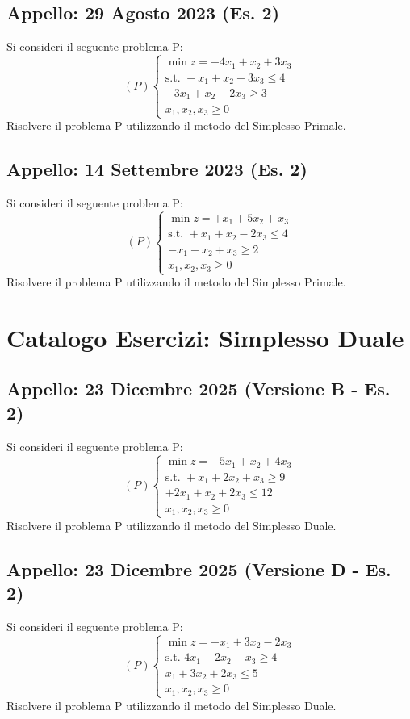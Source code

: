 \documentclass[11pt, a4paper]{article}
\begin{document}
\subsection{Appello: 29 Agosto 2023 (Es. 2)}
Si consideri il seguente problema P:
\[ (P) \begin{cases} \min z = -4x_1 + x_2 + 3x_3 \\ \text{s.t. } -x_1 + x_2 + 3x_3 \le 4 \\ -3x_1 + x_2 - 2x_3 \ge 3 \\ x_1, x_2, x_3 \ge 0 \end{cases} \]
Risolvere il problema P utilizzando il metodo del Simplesso Primale.

\subsection{Appello: 14 Settembre 2023 (Es. 2)}
Si consideri il seguente problema P:
\[ (P) \begin{cases} \min z = +x_1 + 5x_2 + x_3 \\ \text{s.t. } +x_1 + x_2 - 2x_3 \le 4 \\ -x_1 + x_2 + x_3 \ge 2 \\ x_1, x_2, x_3 \ge 0 \end{cases} \]
Risolvere il problema P utilizzando il metodo del Simplesso Primale.

\section{Catalogo Esercizi: Simplesso Duale}

\subsection{Appello: 23 Dicembre 2025 (Versione B - Es. 2)}
Si consideri il seguente problema P:
\[ (P) \begin{cases} \min z = -5x_1 + x_2 + 4x_3 \\ \text{s.t. } +x_1 + 2x_2 + x_3 \ge 9 \\ +2x_1 + x_2 + 2x_3 \le 12 \\ x_1, x_2, x_3 \ge 0 \end{cases} \]
Risolvere il problema P utilizzando il metodo del Simplesso Duale.

\subsection{Appello: 23 Dicembre 2025 (Versione D - Es. 2)}
Si consideri il seguente problema P:
\[ (P) \begin{cases} \min z = -x_1 + 3x_2 - 2x_3 \\ \text{s.t. } 4x_1 - 2x_2 - x_3 \ge 4 \\ x_1 + 3x_2 + 2x_3 \le 5 \\ x_1, x_2, x_3 \ge 0 \end{cases} \]
Risolvere il problema P utilizzando il metodo del Simplesso Duale.
\end{document}
